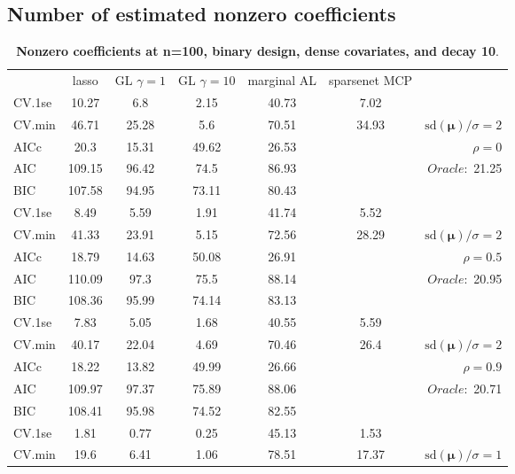 \clearpage

\subsection{Number of estimated nonzero coefficients}



\begin{table}\vspace{-.5cm}
\caption[l]{ { \bf Nonzero coefficients at n=100, binary design, 
dense covariates, and  decay  10}.}
\vspace{-.5cm}
\footnotesize{}
\begin{center}
\begin{tabular}{l*{5}{c}|r}
& lasso & GL $\gamma=1$ & GL $\gamma=10$ & marginal AL & sparsenet MCP  & \\
 \cline{1-7}
CV.1se & 10.27 & 6.8 & 2.15 & 40.73 & 7.02 & \\
CV.min & 46.71 & 25.28 & 5.6 & 70.51 & 34.93 &  $\mathrm{sd}(\mathbf{\mu})/\sigma=2$ \\
AICc & 20.3 & 15.31 & 49.62 & 26.53 & & $\rho=0$ \\
AIC & 109.15 & 96.42 & 74.5 & 86.93 & &  \multirow{2}{*}{$Oracle: $ 21.25} \\
BIC & 107.58 & 94.95 & 73.11 & 80.43 & &  \\
 \hline 
CV.1se & 8.49 & 5.59 & 1.91 & 41.74 & 5.52 & \\
CV.min & 41.33 & 23.91 & 5.15 & 72.56 & 28.29 &  $\mathrm{sd}(\mathbf{\mu})/\sigma=2$ \\
AICc & 18.79 & 14.63 & 50.08 & 26.91 & & $\rho=0.5$ \\
AIC & 110.09 & 97.3 & 75.5 & 88.14 & &  \multirow{2}{*}{$Oracle: $ 20.95} \\
BIC & 108.36 & 95.99 & 74.14 & 83.13 & &  \\
 \hline 
CV.1se & 7.83 & 5.05 & 1.68 & 40.55 & 5.59 & \\
CV.min & 40.17 & 22.04 & 4.69 & 70.46 & 26.4 &  $\mathrm{sd}(\mathbf{\mu})/\sigma=2$ \\
AICc & 18.22 & 13.82 & 49.99 & 26.66 & & $\rho=0.9$ \\
AIC & 109.97 & 97.37 & 75.89 & 88.06 & &  \multirow{2}{*}{$Oracle: $ 20.71} \\
BIC & 108.41 & 95.98 & 74.52 & 82.55 & &  \\
 \hline 
CV.1se & 1.81 & 0.77 & 0.25 & 45.13 & 1.53 & \\
CV.min & 19.6 & 6.41 & 1.06 & 78.51 & 17.37 &  $\mathrm{sd}(\mathbf{\mu})/\sigma=1$ \\

\end{tabular}
\end{center}
\end{table}
